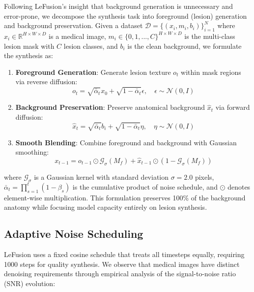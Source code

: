 \documentclass[10pt,twocolumn,letterpaper]{article}
\begin{document}
Following LeFusion's insight that background generation is unnecessary and error-prone, we decompose the synthesis task into foreground (lesion) generation and background preservation. Given a dataset $\mathcal{D} = \{(x_i, m_i, b_i)\}_{i=1}^N$ where $x_i \in \mathbb{R}^{H \times W \times D}$ is a medical image, $m_i \in \{0,1,...,C\}^{H \times W \times D}$ is the multi-class lesion mask with $C$ lesion classes, and $b_i$ is the clean background, we formulate the synthesis as:

\begin{enumerate}
    \item \textbf{Foreground Generation}: Generate lesion texture $o_t$ within mask regions via reverse diffusion:
    \begin{equation}
    o_t = \sqrt{\bar{\alpha}_t} x_0 + \sqrt{1-\bar{\alpha}_t} \epsilon, \quad \epsilon \sim \mathcal{N}(0, I)
    \end{equation}
    
    \item \textbf{Background Preservation}: Preserve anatomical background $\hat{x}_t$ via forward diffusion:
    \begin{equation}
    \hat{x}_t = \sqrt{\bar{\alpha}_t} b_i + \sqrt{1-\bar{\alpha}_t} \eta, \quad \eta \sim \mathcal{N}(0, I)
    \end{equation}
    
    \item \textbf{Smooth Blending}: Combine foreground and background with Gaussian smoothing:
    \begin{equation}
    x_{t-1} = o_{t-1} \odot \mathcal{G}_\sigma(M_f) + \hat{x}_{t-1} \odot (1-\mathcal{G}_\sigma(M_f))
    \end{equation}
\end{enumerate}

where $\mathcal{G}_\sigma$ is a Gaussian kernel with standard deviation $\sigma = 2.0$ pixels, $\bar{\alpha}_t = \prod_{s=1}^t (1-\beta_s)$ is the cumulative product of noise schedule, and $\odot$ denotes element-wise multiplication. This formulation preserves 100\% of the background anatomy while focusing model capacity entirely on lesion synthesis.

\subsection{Adaptive Noise Scheduling}

LeFusion uses a fixed cosine schedule that treats all timesteps equally, requiring 1000 steps for quality synthesis. We observe that medical images have distinct denoising requirements through empirical analysis of the signal-to-noise ratio (SNR) evolution:
\end{document}
